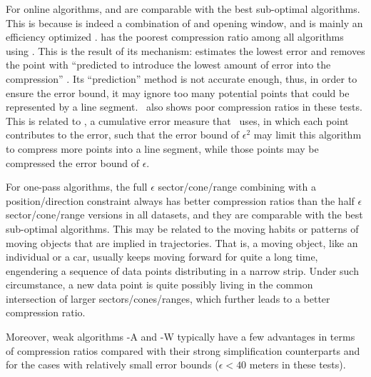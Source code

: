 For online algorithms, \bqsa and \opwa are comparable with the best sub-optimal algorithms. This is because \opwa is indeed a combination of \dpa and opening window, and \bqsa is mainly an efficiency optimized \opwa.
\squishe has the poorest compression ratio among all algorithms using \sed. This is the result of its mechanism: \squishe estimates the lowest \sed error and removes the point with ``predicted to introduce the lowest amount of error into the compression'' \cite{Muckell:SQUISH}. Its ``prediction'' method is not accurate enough, thus, in order to ensure the error bound, it may ignore too many potential points that could be represented by a line segment. {\dagots~also shows poor compression ratios in these tests. This is related to \lissed, a cumulative error measure that \dagots~uses, in which each point contributes to the error, such that the \lissed error bound of $\epsilon^2$ may limit this algorithm to compress more points into a line segment, while those points may be compressed \wrt the  \sed error bound of $\epsilon$.}

For one-pass algorithms, the full $\epsilon$ sector/cone/range combining with a position/direction constraint always has better compression ratios than the half $\epsilon$ sector/cone/range versions in all datasets, and they are comparable with the best sub-optimal algorithms.
This may be related to the moving habits or patterns of moving objects that are implied in trajectories.
That is, a moving object, like an individual or a car, usually keeps moving forward for quite a long time, engendering a sequence of data points distributing in a narrow strip. Under such circumstance, a new data point is quite possibly living in the common intersection of larger sectors/cones/ranges, which further leads to a better compression ratio.

{Moreover, weak algorithms \operb-A and \cised-W typically have a few advantages in terms of compression ratios compared with their strong simplification counterparts \operb and \cised for the cases with relatively small error bounds (\eg $\epsilon<40$ meters in these tests).}




